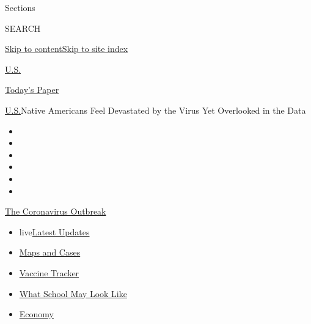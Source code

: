 Sections

SEARCH

\protect\hyperlink{site-content}{Skip to
content}\protect\hyperlink{site-index}{Skip to site index}

\href{https://www.nytimes.com/section/us}{U.S.}

\href{https://myaccount.nytimes.com/auth/login?response_type=cookie\&client_id=vi}{}

\href{https://www.nytimes.com/section/todayspaper}{Today's Paper}

\href{/section/us}{U.S.}\textbar{}Native Americans Feel Devastated by
the Virus Yet Overlooked in the Data

\begin{itemize}
\item
\item
\item
\item
\item
\item
\end{itemize}

\href{https://www.nytimes.com/news-event/coronavirus?action=click\&pgtype=Article\&state=default\&region=TOP_BANNER\&context=storylines_menu}{The
Coronavirus Outbreak}

\begin{itemize}
\tightlist
\item
  live\href{https://www.nytimes.com/2020/08/02/world/coronavirus-updates.html?action=click\&pgtype=Article\&state=default\&region=TOP_BANNER\&context=storylines_menu}{Latest
  Updates}
\item
  \href{https://www.nytimes.com/interactive/2020/us/coronavirus-us-cases.html?action=click\&pgtype=Article\&state=default\&region=TOP_BANNER\&context=storylines_menu}{Maps
  and Cases}
\item
  \href{https://www.nytimes.com/interactive/2020/science/coronavirus-vaccine-tracker.html?action=click\&pgtype=Article\&state=default\&region=TOP_BANNER\&context=storylines_menu}{Vaccine
  Tracker}
\item
  \href{https://www.nytimes.com/interactive/2020/07/29/us/schools-reopening-coronavirus.html?action=click\&pgtype=Article\&state=default\&region=TOP_BANNER\&context=storylines_menu}{What
  School May Look Like}
\item
  \href{https://www.nytimes.com/live/2020/07/31/business/stock-market-today-coronavirus?action=click\&pgtype=Article\&state=default\&region=TOP_BANNER\&context=storylines_menu}{Economy}
\end{itemize}

